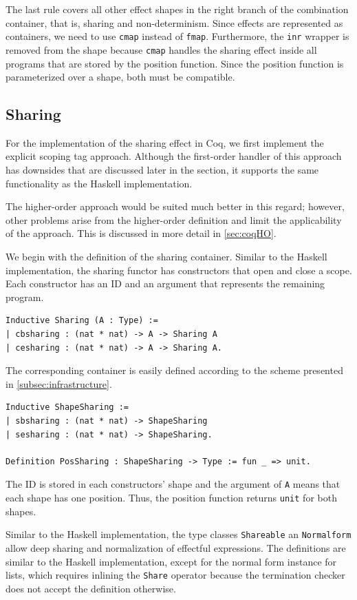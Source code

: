 \documentclass[a4paper, 11pt, fleqn, twoside, abstract=on]{scrreprt}
\newcommand{\cinl}[1]{\texttt{#1}}
\begin{document}
The last rule covers all other effect shapes in the right branch of the combination container, that is, sharing and non-determinism.
Since effects are represented as containers, we need to use \cinl{cmap} instead of \cinl{fmap}.
Furthermore, the \cinl{inr} wrapper is removed from the shape because \cinl{cmap} handles the sharing effect inside all programs that are stored by the position function.
Since the position function is parameterized over a shape, both must be compatible.

\subsection{Sharing}
For the implementation of the sharing effect in Coq, we first implement the explicit scoping tag approach.
Although the first-order handler of this approach has downsides that are discussed later in the section, it supports the same functionality as the Haskell implementation.

The higher-order approach would be suited much better in this regard; however, other problems arise from the higher-order definition and limit the applicability of the approach.
This is discussed in more detail in \autoref{sec:coqHO}.

We begin with the definition of the sharing container.
Similar to the Haskell implementation, the sharing functor has constructors that open and close a scope.
Each constructor has an ID and an argument that represents the remaining program.

\begin{verbatim}
Inductive Sharing (A : Type) :=
| cbsharing : (nat * nat) -> A -> Sharing A
| cesharing : (nat * nat) -> A -> Sharing A.
\end{verbatim}

The corresponding container is easily defined according to the scheme presented in \autoref{subsec:infrastructure}.

\begin{verbatim}
Inductive ShapeSharing :=
| sbsharing : (nat * nat) -> ShapeSharing
| sesharing : (nat * nat) -> ShapeSharing.

Definition PosSharing : ShapeSharing -> Type := fun _ => unit.
\end{verbatim}
\noindent
The ID is stored in each constructors' shape and the argument of \cinl{A} means that each shape has one position.
Thus, the position function returns \cinl{unit} for both shapes.

Similar to the Haskell implementation, the type classes \cinl{Shareable} an \cinl{Normalform} allow deep sharing and normalization of effectful expressions.
The definitions are similar to the Haskell implementation, except for the normal form instance for lists, which requires inlining the \cinl{Share} operator because the termination checker does not accept the definition otherwise.
\end{document}
